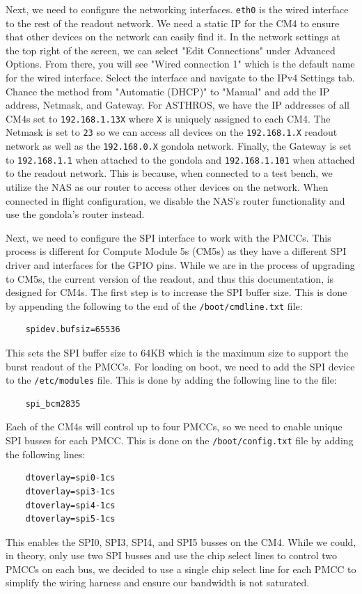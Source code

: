 Next, we need to configure the networking interfaces. 
\texttt{eth0} is the wired interface to the rest of the readout network. 
We need a static IP for the CM4 to ensure that other devices on the network can easily find it.
In the network settings at the top right of the screen, we can select "Edit Connections" under Advanced Options. 
From there, you will see "Wired connection 1" which is the default name for the wired interface.
Select the interface and navigate to the IPv4 Settings tab.
Chance the method from "Automatic (DHCP)" to "Manual" and add the IP address, Netmask, and Gateway.
For ASTHROS, we have the IP addresses of all CM4s set to \texttt{192.168.1.13X} where \texttt{X} is uniquely assigned to each CM4.
The Netmask is set to \texttt{23} so we can access all devices on the \texttt{192.168.1.X} readout network as well as the \texttt{192.168.0.X} gondola network.
Finally, the Gateway is set to \texttt{192.168.1.1} when attached to the gondola and \texttt{192.168.1.101} when attached to the readout network.
This is because, when connected to a test bench, we utilize the NAS as our router to access other devices on the network.
When connected in flight configuration, we disable the NAS's router functionality and use the gondola's router instead.

Next, we need to configure the SPI interface to work with the PMCCs.
This process is different for Compute Module 5s (CM5s) as they have a different SPI driver and interfaces for the GPIO pins.
While we are in the process of upgrading to CM5s, the current version of the readout, and thus this documentation, is designed for CM4s.
The first step is to increase the SPI buffer size.
This is done by appending the following to the end of the \texttt{/boot/cmdline.txt} file:
\begin{verbatim}
    spidev.bufsiz=65536
\end{verbatim}
This sets the SPI buffer size to 64KB which is the maximum size to support the burst readout of the PMCCs.
For loading on boot, we need to add the SPI device to the \texttt{/etc/modules} file.
This is done by adding the following line to the file:
\begin{verbatim}
    spi_bcm2835
\end{verbatim}
Each of the CM4s will control up to four PMCCs, so we need to enable unique SPI busses for each PMCC.
This is done on the \texttt{/boot/config.txt} file by adding the following lines:
\begin{verbatim}
    dtoverlay=spi0-1cs
    dtoverlay=spi3-1cs
    dtoverlay=spi4-1cs
    dtoverlay=spi5-1cs
\end{verbatim}
This enables the SPI0, SPI3, SPI4, and SPI5 busses on the CM4.
While we could, in theory, only use two SPI busses and use the chip select lines to control two PMCCs on each bus, we decided to use a single chip select line for each PMCC to simplify the wiring harness and ensure our bandwidth is not saturated.

